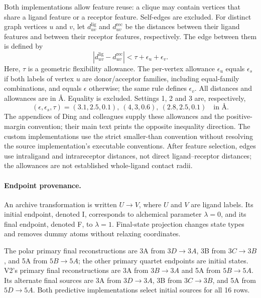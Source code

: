 \documentclass{article}
\begin{document}
Both implementations allow feature reuse: a clique may contain vertices that share a ligand feature or a receptor feature. Self-edges are excluded. For distinct graph vertices \(u\) and \(v\), let \(d^{\mathrm{lig}}_{uv}\) and \(d^{\mathrm{rec}}_{uv}\) be the distances between their ligand features and between their receptor features, respectively. The edge between them is defined by
\[
 |d^{\mathrm{lig}}_{uv}-d^{\mathrm{rec}}_{uv}|
 <\tau+\epsilon_u+\epsilon_v.
\]
Here, \(\tau\) is a geometric flexibility allowance. The per-vertex allowance \(\epsilon_u\) equals \(\epsilon_s\) if both labels of vertex \(u\) are donor/acceptor families, including equal-family combinations, and equals \(\epsilon\) otherwise; the same rule defines \(\epsilon_v\). All distances and allowances are in \AA. Equality is excluded. Settings 1, 2 and 3 are, respectively,
\[
 (\epsilon,\epsilon_s,\tau)
 =(3.1,2.5,0.1),\ (4,3,0.6),\ (2.8,2.5,0.1)
 \quad\text{in \AA}.
\]
The appendices of Ding and colleagues supply these allowances and the positive-margin convention; their main text prints the opposite inequality direction. The custom implementations use the strict smaller-than convention without resolving the source implementation's executable conventions. After feature selection, edges use intraligand and intrareceptor distances, not direct ligand--receptor distances; the allowances are not established whole-ligand contact radii.\cite{P}

\paragraph{Endpoint provenance.}
An archive transformation is written \(U\to V\), where \(U\) and \(V\) are ligand labels. Its initial endpoint, denoted I, corresponds to alchemical parameter \(\lambda=0\), and its final endpoint, denoted F, to \(\lambda=1\). Final-state projection changes state types and removes dummy atoms without relaxing coordinates.

The polar primary final reconstructions are 3A from \(3D\to3A\), 3B from \(3C\to3B\), and 5A from \(5B\to5A\); the other primary quartet endpoints are initial states. V2's primary final reconstructions are 3A from \(3B\to3A\) and 5A from \(5B\to5A\). Its alternate final sources are 3A from \(3D\to3A\), 3B from \(3C\to3B\), and 5A from \(5D\to5A\). Both predictive implementations select initial sources for all 16 rows.
\end{document}
